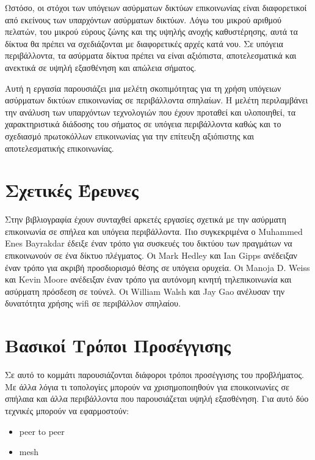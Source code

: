 \documentclass[12pt]{article}
\begin{document}
\begin{multicols}{2}
        Ωστόσο, οι στόχοι των υπόγειων ασύρματων δικτύων επικοινωνίας είναι
        διαφορετικοί από εκείνους των υπαρχόντων ασύρματων δικτύων.
        Λόγω του μικρού αριθμού πελατών, του μικρού εύρους ζώνης και της
        υψηλής ανοχής καθυστέρησης, 
        αυτά τα δίκτυα θα πρέπει να σχεδιάζονται με διαφορετικές αρχές κατά νου. 
        Σε υπόγεια περιβάλλοντα, τα ασύρματα δίκτυα πρέπει να είναι αξιόπιστα,
        αποτελεσματικά και ανεκτικά σε υψηλή εξασθένηση και απώλεια σήματος.

        Αυτή η εργασία παρουσιάζει μια μελέτη σκοπιμότητας για τη χρήση 
        υπόγειων ασύρματων δικτύων επικοινωνίας σε περιβάλλοντα σπηλαίων. 
        Η μελέτη περιλαμβάνει την ανάλυση των υπαρχόντων τεχνολογιών που 
        έχουν προταθεί και υλοποιηθεί, τα χαρακτηριστικά διάδοσης του 
        σήματος σε υπόγεια περιβάλλοντα καθώς και το σχεδιασμό 
        πρωτοκόλλων επικοινωνίας για την επίτευξη αξιόπιστης και 
        αποτελεσματικής επικοινωνίας.

    \section{\normalsize \textsf{Σχετικές Έρευνες}}
    Στην βιβλιογραφία έχουν συνταχθεί αρκετές εργασίες
    σχετικά με την ασύρματη επικοινωνία σε σπήλεα και 
    υπόγεια περιβάλλοντα. 
    Πιο συγκεκριμένα ο Muhammed Enes Bayrakdar έδειξε 
    έναν τρόπο για συσκευές του δικτύου 
    των πραγμάτων να επικοινωνούν σε ένα δίκτυο πλέγματος. 
    Οι Mark Hedley και Ian Gipps ανέδειξαν έναν τρόπο για
    ακριβή προσδιορισμό θέσης σε υπόγεια ορυχεία. 
    Οι Manoja D. Weiss και Kevin Moore ανέδειξαν έναν τρόπο 
    για αυτόνομη κινητή τηλεπικοινωνία και ασύρματη πρόσδεση σε τούνελ.
    Οι William Walsh και Jay Gao ανέλυσαν την δυνατότητα χρήσης wifi
    σε περιβάλλον σπηλαίου. 

    \section{\normalsize \textsf{Βασικοί Τρόποι Προσέγγισης}}
    
        Σε αυτό το κομμάτι παρουσιάζονται διάφοροι τρόποι
        προσέγγισης του προβλήματος. Με άλλα λόγια τι 
        τοπολογίες μπορούν να χρισημοποιηθούν για εποικοινωνίες σε 
        σπήλαια και άλλα περιβάλλοντα που παρουσιάζεται υψηλή εξασθένηση.
    Για αυτό δύο τεχνικές μπορούν να εφαρμοστούν:
    \begin{itemize}
        \item peer to peer
        \item mesh
    \end{itemize}


\end{multicols}
\end{document}

